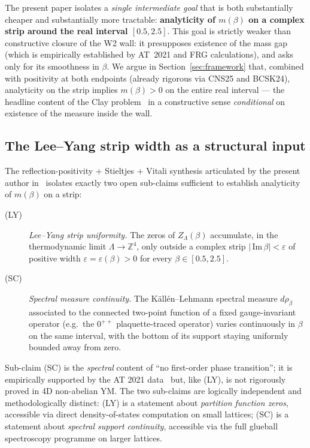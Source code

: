 \documentclass[11pt,a4paper]{article}
\theoremstyle{definition}
\theoremstyle{remark}
\newcommand{\Z}{\mathbb{Z}}
\newcommand{\sgnIm}{\,\mathrm{Im}\,}
\begin{document}
The present paper isolates a \emph{single intermediate goal} that
is both substantially cheaper and substantially more tractable:
\textbf{analyticity of $m(\beta)$ on a complex strip around the
real interval $[0.5, 2.5]$}. This goal is strictly weaker than
constructive closure of the W2 wall: it presupposes existence of
the mass gap (which is empirically established by AT~2021 and FRG
calculations), and asks only for its smoothness in $\beta$. We argue
in Section~\ref{sec:framework} that, combined with positivity at
both endpoints (already rigorous via CNS25 and BCSK24), analyticity
on the strip implies $m(\beta) > 0$ on the entire real interval ---
the headline content of the Clay problem~\cite{JaffeWitten2000} in a
constructive sense \emph{conditional} on existence of the measure
inside the wall.

\subsection{The Lee--Yang strip width as a structural input}

The reflection-positivity + Stieltjes + Vitali synthesis
articulated by the present author in~\cite{W2analyticite2026}
isolates exactly two open sub-claims sufficient to establish
analyticity of $m(\beta)$ on a strip:
\begin{description}
\item[(LY)] \emph{Lee--Yang strip uniformity.} The zeros of
$Z_\Lambda(\beta)$ accumulate, in the thermodynamic limit
$\Lambda \to \Z^4$, only outside a complex strip
$|\sgnIm \beta| < \varepsilon$ of positive width
$\varepsilon = \varepsilon(\beta) > 0$ for every
$\beta \in [0.5, 2.5]$.
\item[(SC)] \emph{Spectral measure continuity.} The
K\"all\'en--Lehmann spectral measure $d\rho_\beta$ associated to
the connected two-point function of a fixed gauge-invariant
operator (e.g.\ the $0^{++}$ plaquette-traced operator) varies
continuously in $\beta$ on the same interval, with the bottom of
its support staying uniformly bounded away from zero.
\end{description}

Sub-claim (SC) is the \emph{spectral} content of ``no first-order
phase transition''; it is empirically supported by the AT 2021
data~\cite{AthenodorouTeper2021} but, like (LY), is not rigorously
proved in 4D non-abelian YM. The two sub-claims are logically
independent and methodologically distinct: (LY) is a statement
about \emph{partition function zeros}, accessible via direct
density-of-states computation on small lattices; (SC) is a statement
about \emph{spectral support continuity}, accessible via the
full glueball spectroscopy programme on larger lattices.
\end{document}

